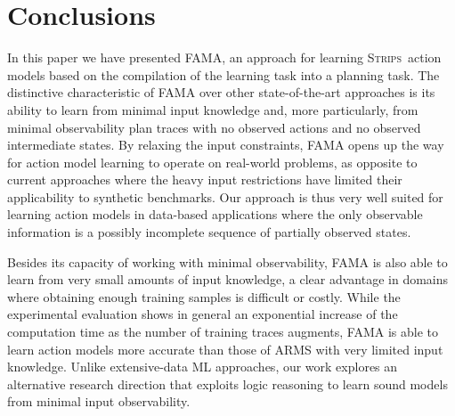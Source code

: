 \documentclass[3p,times]{elsarticle}
\newcommand{\strips}{\textsc{Strips}}     %
\newcommand{\ARMS}{{\small {\sffamily ARMS}}\xspace}
\newcommand{\FAMA}{{\small {\sffamily FAMA}}\xspace}
\begin{document}








%






\section{Conclusions}
\label{sec:conclusions}


In this paper we have presented \FAMA, an approach for learning \strips\ action models based on the compilation of the learning task into a planning task. The distinctive characteristic of \FAMA over other state-of-the-art approaches is its ability to learn from minimal input knowledge and, more particularly, from minimal observability plan traces with no observed actions and no observed intermediate states. By relaxing the input constraints, \FAMA opens up the way for action model learning to operate on real-world problems, as opposite to current approaches where the heavy input restrictions have limited their applicability to synthetic benchmarks. Our approach is thus very well suited for learning action models in data-based applications where the only observable information is a possibly incomplete sequence of partially observed states.

Besides its capacity of working with minimal observability, \FAMA is also able to learn from very small amounts of input knowledge, a clear advantage in domains where obtaining enough training samples is difficult or costly. While the experimental evaluation shows in general an exponential increase of the computation time as the number of training traces augments, \FAMA is able to learn action models more accurate than those of \ARMS with very limited input knowledge. Unlike extensive-data ML approaches, our work explores an alternative research direction that exploits logic reasoning to learn sound models from minimal input observability.
\end{document}
